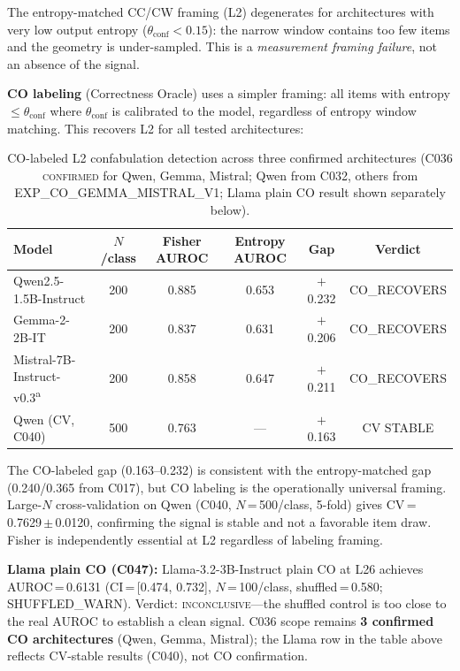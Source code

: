 \documentclass[11pt]{article}
\begin{document}
The entropy-matched CC/CW framing (L2) degenerates for architectures with very low
output entropy ($\theta_{\text{conf}} < 0.15$): the narrow window contains too few
items and the geometry is under-sampled. This is a \emph{measurement framing failure},
not an absence of the signal.

\textbf{CO labeling} (Correctness Oracle) uses a simpler framing: all items with
entropy $\leq \theta_{\text{conf}}$ where $\theta_{\text{conf}}$ is calibrated to the
model, regardless of entropy window matching. This recovers L2 for all tested architectures:

\begin{table}[h!]
\centering
\caption{CO-labeled L2 confabulation detection across three confirmed architectures
  (C036 \textsc{confirmed} for Qwen, Gemma, Mistral; Qwen from C032, others from
  EXP\_CO\_GEMMA\_MISTRAL\_V1; Llama plain CO result shown separately below).}
\begin{tabular}{lccccc}
\toprule
Model & $N$/class & Fisher AUROC & Entropy AUROC & Gap & Verdict \\
\midrule
Qwen2.5-1.5B-Instruct & 200 & 0.885 & 0.653 & $+$0.232 & CO\_RECOVERS \\
Gemma-2-2B-IT & 200 & 0.837 & 0.631 & $+$0.206 & CO\_RECOVERS \\
Mistral-7B-Instruct-v0.3\textsuperscript{a} & 200 & 0.858 & 0.647 & $+$0.211 & CO\_RECOVERS \\
Qwen (CV, C040) & 500 & 0.763 & --- & $+$0.163 & CV STABLE \\
\bottomrule
\end{tabular}
\end{table}

The CO-labeled gap (0.163--0.232) is consistent with the entropy-matched gap
(0.240/0.365 from C017), but CO labeling is the operationally universal framing.
Large-$N$ cross-validation on Qwen (C040, $N$\,=\,500/class, 5-fold) gives
CV\,=\,0.7629\,$\pm$\,0.0120, confirming the signal is stable and not a favorable
item draw. Fisher is independently essential at L2 regardless of labeling framing.

\textbf{Llama plain CO (C047):} Llama-3.2-3B-Instruct plain CO at L26 achieves
AUROC\,=\,0.6131 (CI\,=\,[0.474, 0.732], $N$\,=\,100/class, shuffled\,=\,0.580;
SHUFFLED\_WARN). Verdict: \textsc{inconclusive}---the shuffled control is too close
to the real AUROC to establish a clean signal. C036 scope remains \textbf{3 confirmed
CO architectures} (Qwen, Gemma, Mistral); the Llama row in the table above reflects
CV-stable results (C040), not CO confirmation.
\end{document}
